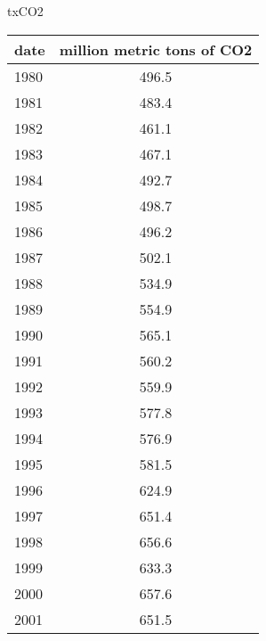\documentclass{mcmthesis}
\begin{document}




\begin{appendices}


\begin{minipage}{\textwidth}
  \begin{minipage}[t]{0.45\textwidth}
    \centering
      \makeatletter{}\makeatother\caption{txCO2}
      \begin{tabular}{|l|c|}
        \hline
        date & million metric tons of CO2 \\ \hline
        1980 & 496.5                      \\ \hline
        1981 & 483.4                      \\ \hline
        1982 & 461.1                      \\ \hline
        1983 & 467.1                      \\ \hline
        1984 & 492.7                      \\ \hline
        1985 & 498.7                      \\ \hline
        1986 & 496.2                      \\ \hline
        1987 & 502.1                      \\ \hline
        1988 & 534.9                      \\ \hline
        1989 & 554.9                      \\ \hline
        1990 & 565.1                      \\ \hline
        1991 & 560.2                      \\ \hline
        1992 & 559.9                      \\ \hline
        1993 & 577.8                      \\ \hline
        1994 & 576.9                      \\ \hline
        1995 & 581.5                      \\ \hline
        1996 & 624.9                      \\ \hline
        1997 & 651.4                      \\ \hline
        1998 & 656.6                      \\ \hline
        1999 & 633.3                      \\ \hline
        2000 & 657.6                      \\ \hline
        2001 & 651.5                      \\ \hline

\end{tabular}
\end{minipage}
\end{minipage}
\end{appendices}
\end{document}
